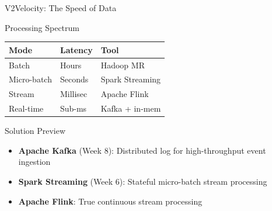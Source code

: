 \documentclass[aspectratio=169,10pt]{beamer}
\begin{document}
\begin{frame}{V2\textemdash Velocity: The Speed of Data}
      \begin{block}{Processing Spectrum}
        \small
        \renewcommand{\arraystretch}{1.25}
        \begin{tabular}{lll}
          \toprule
          \textbf{Mode} & \textbf{Latency} & \textbf{Tool} \\
          \midrule
          Batch         & Hours    & Hadoop MR \\
          Micro-batch   & Seconds  & Spark Streaming \\
          Stream        & Millisec & Apache Flink \\
          Real-time     & Sub-ms   & Kafka + in-mem \\
          \bottomrule
        \end{tabular}
      \end{block}
      \vspace{6pt}
      \begin{exampleblock}{Solution Preview}
        \begin{itemize}
          \small
          \item \textbf{Apache Kafka} (Week 8): Distributed log for high-throughput event ingestion
          \item \textbf{Spark Streaming} (Week 6): Stateful micro-batch stream processing
          \item \textbf{Apache Flink}: True continuous stream processing
        \end{itemize}
      \end{exampleblock}
\end{frame}
\end{document}

